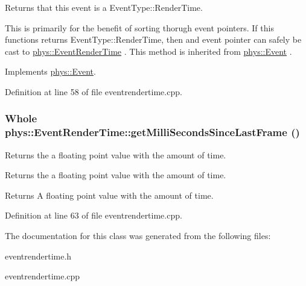 Returns that this event is a EventType::RenderTime. 

This is primarily for the benefit of sorting thorugh event pointers. If this functions returns EventType::RenderTime, then and event pointer can safely be cast to \hyperlink{classphys_1_1EventRenderTime}{phys::EventRenderTime} . This method is inherited from \hyperlink{classphys_1_1Event}{phys::Event} . 

Implements \hyperlink{classphys_1_1Event_ac2c0623a6bc399e62f4b9fb2c022ea73}{phys::Event}.



Definition at line 58 of file eventrendertime.cpp.

\hypertarget{classphys_1_1EventRenderTime_ac9f20f13bf1f6e542151be2ce8ea2fa4}{
\subsubsection[{getMilliSecondsSinceLastFrame}]{\setlength{\rightskip}{0pt plus 5cm}Whole phys::EventRenderTime::getMilliSecondsSinceLastFrame ()}}
\label{d3/d8b/classphys_1_1EventRenderTime_ac9f20f13bf1f6e542151be2ce8ea2fa4}


Returns the a floating point value with the amount of time. 

Returns the a floating point value with the amount of time. \begin{DoxyReturn}{Returns}
A floating point value with the amount of time. 
\end{DoxyReturn}


Definition at line 63 of file eventrendertime.cpp.



The documentation for this class was generated from the following files:\begin{DoxyCompactItemize}
\item 
eventrendertime.h\item 
eventrendertime.cpp\end{DoxyCompactItemize}
